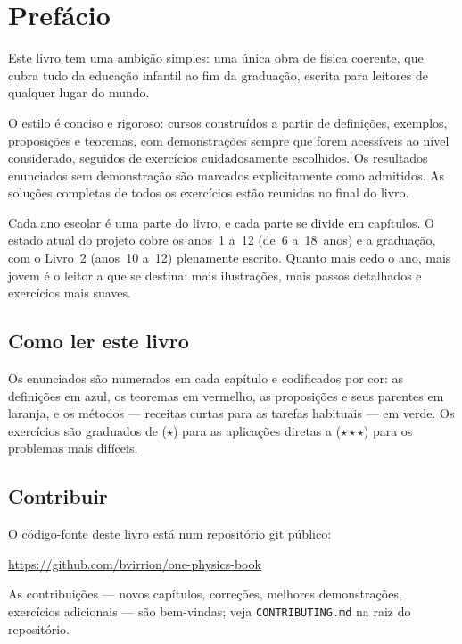 \chapter{Prefácio}

Este livro tem uma ambição simples: uma única obra de física
coerente, que cubra tudo da educação infantil ao fim da graduação,
escrita para leitores de qualquer lugar do mundo.

O estilo é conciso e rigoroso: cursos construídos a partir de
definições, exemplos, proposições e teoremas, com demonstrações
sempre que forem acessíveis ao nível considerado, seguidos de
exercícios cuidadosamente escolhidos. Os resultados enunciados sem
demonstração são marcados explicitamente como admitidos. As soluções
completas de todos os exercícios estão reunidas no final do livro.

Cada ano escolar é uma parte do livro, e cada parte se divide em
capítulos. O estado atual do projeto cobre os anos~1 a~12 (de~6
a~18~anos) e a graduação, com o Livro~2 (anos~10 a~12) plenamente
escrito. Quanto mais cedo o ano, mais jovem é o leitor a que se
destina: mais ilustrações, mais passos detalhados e exercícios mais
suaves.

\section*{Como ler este livro}

Os enunciados são numerados em cada capítulo e codificados por
cor: as definições em azul, os teoremas em vermelho, as proposições
e seus parentes em laranja, e os métodos --- receitas curtas para as
tarefas habituais --- em verde. Os exercícios são graduados de
($\star$) para as aplicações diretas a ($\star\star\star$) para os
problemas mais difíceis.

\section*{Contribuir}

O código-fonte deste livro está num repositório git público:
\begin{center}
\url{https://github.com/bvirrion/one-physics-book}
\end{center}
As contribuições --- novos capítulos, correções, melhores
demonstrações, exercícios adicionais --- são bem-vindas; veja
\texttt{CONTRIBUTING.md} na raiz do repositório.
